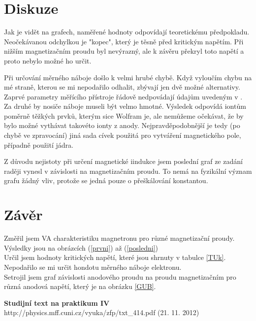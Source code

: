 \documentclass[a4paper,12pt]{article}
\begin{document}
\section{Diskuze}
Jak je vidět na grafech, naměřené hodnoty odpovídají teoretickému předpokladu. Neočekávanou odchylkou je "kopec", který je těsně před kritickým napětím. Při nižším magnetizačním proudu byl nevýrazný, ale k závěru překryl 
toto napětí a proto nebylo možné ho určit.

Při určování měrného náboje došlo k velmi hrubé chybě. Když vyloučím chybu na mé straně, kterou se mi nepodařilo odhalit, zbývají jen dvě možné alternativy. Zaprvé parametry měřícího přístroje řádově nedpovádají údajům uvedeným 
v \cite{text}. Za druhé by nosiče náboje museli být velmo hmotné. Výsledek odpovídá iontům poměrně těžkých prvků, kterým sice Wolfram je, ale nemůžeme očekávat, že by bylo možné vythávat takovéto ionty z anody. Nejpravděpodobnější 
je tedy (po chybě ve zpravocání) jiná sada cívek použitá pro vytváření magnetického pole, případně použití jádra.

Z důvodu nejistoty při určení magnetické iindukce jsem poslední graf ze zadání raději vynesl v závislosti na magnetizačním proudu. To nemá na fyzikální význam grafu žádný vliv, protože se jedná pouze o přeškálování konstantou.

\eject

\section{Závěr}
Změřil jsem VA charakteristiku magnetronu pro různé magnetizační proudy. Výsledky jsou na obrázcích (\ref{prvni}) až (\ref{posledni}) \\
Určil jsem hodnoty kritických napětí, které jsou shrnuty v tabulce \ref{TUk}. \\
Nepodařilo se mi určit hondotu měrného náboje elektronu. \\
Setrojil jsem graf závislosti anodového proudu na proudu magnetizačním pro různá anodová napětí, který je na obrázku \ref{GUB}.


\begin{thebibliography}{5}
	 \textbf{Studijní text na praktikum IV} \\http://physics.mff.cuni.cz/vyuka/zfp/txt\_414.pdf (21. 11. 2012)
\end{thebibliography}
\end{document}
